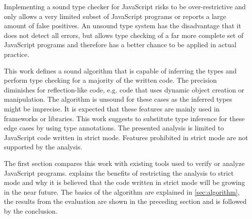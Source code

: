 Implementing a sound type checker for JavaScript risks to be over-restrictive and only allows a very limited subset of JavaScript programs or reports a large amount of false positives. An unsound type system has the disadvantage that it does not detect all errors, but allows type checking of a far more complete set of JavaScript programs and therefore has a better chance to be applied in actual practice. 

This work defines a sound algorithm that is capable of inferring the types and perform type checking for a majority of the written code. The precision diminishes for reflection-like code, e.g. code that uses dynamic object creation or manipulation. The algorithm is unsound for these cases as the inferred types might be imprecise. It is expected that these features are mainly used in frameworks or libraries. This work suggests to substitute type inference for these edge cases by using type annotations. The presented analysis is limited to JavaScript code written in strict mode. Features prohibited in strict mode are not supported by the analysis.


The first section compares this work with existing tools used to verify or analyze JavaScript programs.  explains the benefits of restricting the analysis to strict mode and why it is believed that the code written in strict mode will be growing in the near future. The basics of the algorithm are explained in \cref{sec:algorithm}, the results from the evaluation are shown in the preceding section and is followed by the conclusion.
